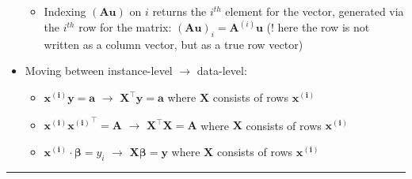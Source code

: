 \begin{itemize}
\begin{itemize}
        \item Indexing $(\boldsymbol{A}\boldsymbol{u})$ on $i$ returns the $i^{th}$ element for the vector, generated via the $i^{th}$ row for the matrix: $(\boldsymbol{A}\boldsymbol{u})_i = \boldsymbol{A}^{(i)}\boldsymbol{u}$ (! here the row is not written as a column vector, but as a true row vector)
    \end{itemize}
    \item Moving between instance-level $\rightarrow$ data-level:
    \begin{itemize}
        \item $\boldsymbol{x^{(i)}} \boldsymbol{y} = \boldsymbol{a}$ $\rightarrow$ $\boldsymbol{X}^\intercal \boldsymbol{y} = \boldsymbol{a}$ where $\boldsymbol{X}$ consists of rows $\boldsymbol{x^{(i)}}$
        \item $\boldsymbol{x^{(i)}} \boldsymbol{x^{(i)}}^\intercal = \boldsymbol{A}$ $\rightarrow$ $\boldsymbol{X}^\intercal \boldsymbol{X} = \boldsymbol{A}$ where $\boldsymbol{X}$ consists of rows $\boldsymbol{x^{(i)}}$
        \item $\boldsymbol{x^{(i)}} \cdot \boldsymbol{\beta} = y_i$ $\rightarrow$ $\boldsymbol{X}\boldsymbol{\beta} = \boldsymbol{y}$ where $\boldsymbol{X}$ consists of rows $\boldsymbol{x^{(i)}}$
    \end{itemize}
\end{itemize}

{\color{lightgray}\hrule height 0.001mm}


